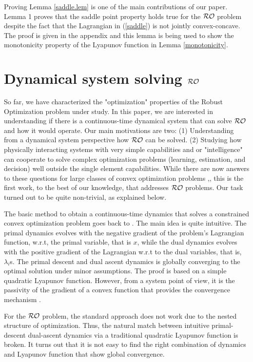 \documentclass[journal,twoside,web]{ieeecolor}
\begin{document}
Proving Lemma \ref{saddle.lem} is one of the main contributions of our paper. Lemma 1 proves that the saddle point property holds true for the ${\cal RO}$ problem despite the fact that the Lagrangian in (\ref{saddle}) is not jointly convex-concave. The proof is given in the appendix and this lemma is being used to show the monotonicity property of the Lyapunov function in Lemma \ref{monotonicity}.

\section{Dynamical system solving ${\cal RO}$} \label{section_pddynamics}

So far,  we have characterized the "optimization" properties of the Robust Optimization problem under study.  In this paper, we are interested in understanding if there is a continuous-time dynamical system that can solve ${\cal RO}$ and how it would operate. Our main motivations are two: (1) Understanding from a dynamical system perspective how ${\cal RO}$ can be solved. (2) Studying how physically interacting systems with very simple capabilities and or "intelligence" can cooperate to solve complex optimization problems (learning, estimation, and decision) well outside the single element capabilities. While there are now answers to these questions for large classes of convex optimization problems \cite{feijer2010},\cite{wang2011}, this is the first work, to the best of our knowledge, that addresses ${\cal RO}$ problems. Our task turned out to be quite non-trivial, as explained below.

The basic method to obtain a continuous-time dynamics that solves a constrained convex optimization problem goes back to \cite{arrow1958}. The main idea is quite intuitive. The primal dynamics evolves with the negative gradient of the problem's Lagrangian function, w.r.t, the primal variable, that is $x$, while the dual dynamics evolves with the positive gradient of the Lagrangian w.r.t to the dual variables, that is, $\lambda_i$s. The primal descent and dual ascent dynamics is globally converging to the optimal solution under minor assumptions. The proof is based on a simple quadratic Lyapunov function. However, from a system point of view, it is the passivity of the gradient of a convex function that provides the convergence mechanism \cite{simpson2016,kosaraju2018}.

For the ${\cal RO}$ problem, the standard approach does not work due to the nested structure of optimization. Thus, the natural match between intuitive primal-descent dual-ascent dynamics via a traditional quadratic Lyapunov function is broken. It turns out that it is not easy to find the right combination of dynamics and Lyapunov function that show global convergence.
\end{document}
